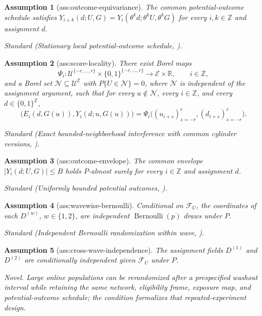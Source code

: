 \documentclass{article}
\newtheorem{assumption}{Assumption}
\begin{document}
\begin{assumption}[ass:outcome-equivariance]\label{ass:outcome-equivariance}
The common potential-outcome schedule satisfies \(Y_{i+k}(d;U,G)=Y_i(\theta^kd;\theta^kU,\theta^kG)\) for every \(i,k\in\mathbb Z\) and assignment \(d\).
\par\smallskip\noindent\emph{Standard} (Stationary local potential-outcome schedule, \cite{ElMachkouriVolnyWu2013}).
\end{assumption}

\begin{assumption}[ass:score-locality]\label{ass:score-locality}
There exist Borel maps
\[
 \Psi_i:\mathcal U^{\{-r,\ldots,r\}}\times
 \{0,1\}^{\{-r,\ldots,r\}}\longrightarrow\mathcal E\times\mathbb R,
 \qquad i\in\mathbb Z,
\]
and a Borel set \(\mathcal N\subseteq\mathcal U^{\mathbb Z}\) with \(P\{U\in\mathcal N\}=0\), where \(\mathcal N\) is independent of the assignment argument, such that for every \(u\notin\mathcal N\), every \(i\in\mathbb Z\), and every \(d\in\{0,1\}^{\mathbb Z}\),
\[
 \bigl(E_i(d,G(u)),Y_i(d;u,G(u))\bigr)
 =\Psi_i\bigl((u_{i+s})_{s=-r}^{r},(d_{i+s})_{s=-r}^{r}\bigr).
\]
\par\smallskip\noindent\emph{Standard} (Exact bounded-neighborhood interference with common cylinder versions, \cite{AronowSamii2017}).
\end{assumption}

\begin{assumption}[ass:outcome-envelope]\label{ass:outcome-envelope}
The common envelope \(|Y_i(d;U,G)|\le B\) holds \(P\)-almost surely for every \(i\in\mathbb Z\) and assignment \(d\).
\par\smallskip\noindent\emph{Standard} (Uniformly bounded potential outcomes, \cite{Leung2022ANI}).
\end{assumption}

\begin{assumption}[ass:wavewise-bernoulli]\label{ass:wavewise-bernoulli}
Conditional on \(\mathcal F_U\), the coordinates of each \(D^{(w)}\), \(w\in\{1,2\}\), are independent \(\operatorname{Bernoulli}(p)\) draws under \(P\).
\par\smallskip\noindent\emph{Standard} (Independent Bernoulli randomization within wave, \cite{Leung2022ANI}).
\end{assumption}

\begin{assumption}[ass:cross-wave-independence]\label{ass:cross-wave-independence}
The assignment fields \(D^{(1)}\) and \(D^{(2)}\) are conditionally independent given \(\mathcal F_U\) under \(P\).
\par\smallskip\noindent\emph{Novel.} Large online populations can be rerandomized after a prespecified washout interval while retaining the same network, eligibility frame, exposure map, and potential-outcome schedule; the condition formalizes that repeated-experiment design.
\end{assumption}
\end{document}
